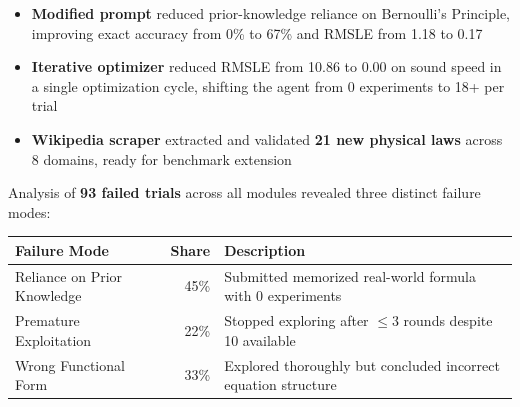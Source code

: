 \begin{tcolorbox}[posterbox, title=Key Findings]
  \color{bodytext}
  \begin{itemize}
    \setlength\itemsep{5pt}
    \item \textbf{Modified prompt} reduced prior-knowledge reliance on
      Bernoulli's Principle, improving exact accuracy from 0\% to 67\%
      and RMSLE from 1.18 to 0.17
    \item \textbf{Iterative optimizer} reduced RMSLE from 10.86 to 0.00
      on sound speed in a single optimization cycle, shifting the agent
      from 0 experiments to 18+ per trial
    \item \textbf{Wikipedia scraper} extracted and validated \textbf{21
      new physical laws} across 8 domains, ready for benchmark extension
  \end{itemize}
\end{tcolorbox}

\vspace{0.35cm}

\begin{tcolorbox}[posterbox, title=Failure Analysis]
  \color{bodytext}\small
  Analysis of \textbf{93 failed trials} across all modules revealed three
  distinct failure modes:
  \vspace{6pt}

  \renewcommand{\arraystretch}{1.4}
  \begin{tabular}{@{}l r p{6cm}@{}}
    \hline
    \textbf{Failure Mode} & \textbf{Share} & \textbf{Description} \\
    \hline
    Reliance on Prior Knowledge & 45\% & Submitted memorized real-world
      formula with 0 experiments \\
    Premature Exploitation      & 22\% & Stopped exploring after
      $\leq$3 rounds despite 10 available \\
    Wrong Functional Form       & 33\% & Explored thoroughly but
      concluded incorrect equation structure \\
    \hline
  \end{tabular}
\end{tcolorbox}

\vspace{0.35cm}

